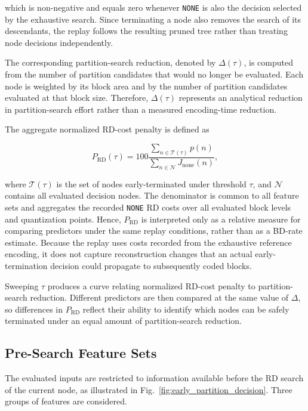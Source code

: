 \documentclass{article}
\begin{document}
which is non-negative and equals zero whenever \texttt{NONE} is also the decision selected by the exhaustive search. Since terminating a node also removes the search of its descendants, the replay follows the resulting pruned tree rather than treating node decisions independently.

The corresponding partition-search reduction, denoted by $\Delta(\tau)$, is computed from the number of partition candidates that would no longer be evaluated. Each node is weighted by its block area and by the number of partition candidates evaluated at that block size. Therefore, $\Delta(\tau)$ represents an analytical reduction in partition-search effort rather than a measured encoding-time reduction.

The aggregate normalized RD-cost penalty is defined as

\begin{equation}
P_{\mathrm{RD}}(\tau)=
100
\frac{
\sum_{n\in\mathcal{T}(\tau)} p(n)
}{
\sum_{n\in\mathcal{N}} J_{\mathrm{none}}(n)
},
\end{equation}

where $\mathcal{T}(\tau)$ is the set of nodes early-terminated under threshold $\tau$, and $\mathcal{N}$ contains all evaluated decision nodes. The denominator is common to all feature sets and aggregates the recorded \texttt{NONE} RD costs over all evaluated block levels and quantization points. Hence, $P_{\mathrm{RD}}$ is interpreted only as a relative measure for comparing predictors under the same replay conditions, rather than as a BD-rate estimate. Because the replay uses costs recorded from the exhaustive reference encoding, it does not capture reconstruction changes that an actual early-termination decision could propagate to subsequently coded blocks.

Sweeping $\tau$ produces a curve relating normalized RD-cost penalty to partition-search reduction. Different predictors are then compared at the same value of $\Delta$, so differences in $P_{\mathrm{RD}}$ reflect their ability to identify which nodes can be safely terminated under an equal amount of partition-search reduction.

\subsection{Pre-Search Feature Sets}

The evaluated inputs are restricted to information available before the RD search of the current node, as illustrated in Fig.~\ref{fig:early_partition_decision}. Three groups of features are considered.
\end{document}
